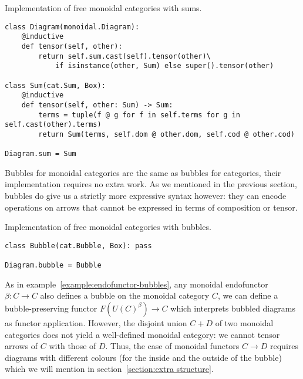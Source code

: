 \begin{python}
{\normalfont Implementation of free monoidal categories with sums.}

\begin{verbatim}
class Diagram(monoidal.Diagram):
    @inductive
    def tensor(self, other):
        return self.sum.cast(self).tensor(other)\
            if isinstance(other, Sum) else super().tensor(other)

class Sum(cat.Sum, Box):
    @inductive
    def tensor(self, other: Sum) -> Sum:
        terms = tuple(f @ g for f in self.terms for g in self.cast(other).terms)
        return Sum(terms, self.dom @ other.dom, self.cod @ other.cod)

Diagram.sum = Sum
\end{verbatim}
\end{python}

Bubbles for monoidal categories are the same as bubbles for categories, their implementation requires no extra work.
As we mentioned in the previous section, bubbles do give us a strictly more expressive syntax however: they can encode operations on arrows that cannot be expressed in terms of composition or tensor.

\begin{python}
{\normalfont Implementation of free monoidal categories with bubbles.}

\begin{verbatim}
class Bubble(cat.Bubble, Box): pass

Diagram.bubble = Bubble
\end{verbatim}
\end{python}

\begin{example}
As in example~\ref{example:endofunctor-bubbles}, any monoidal endofunctor $\beta : C \to C$ also defines a bubble on the monoidal category $C$, we can define a bubble-preserving functor $F(U(C)^\beta) \to C$ which interprets bubbled diagrams as functor application.
However, the disjoint union $C + D$ of two monoidal categories does not yield a well-defined monoidal category: we cannot tensor arrows of $C$ with those of $D$.
Thus, the case of monoidal functors $C \to D$ requires diagrams with different colours (for the inside and the outside of the bubble) which we will mention in section~\ref{section:extra structure}.
\end{example}

